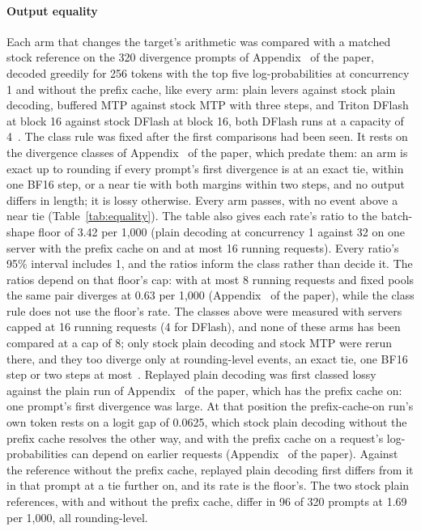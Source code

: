 \paragraph{Output equality}\label{sec:serving-equality} Each arm that changes the target's arithmetic was compared with a matched stock reference on the 320 divergence prompts of Appendix~ of the paper, decoded greedily for 256 tokens with the top five log-probabilities at concurrency 1 and without the prefix cache, like every arm: plain levers against stock plain decoding, buffered MTP against stock MTP with three steps, and Triton DFlash at block 16 against stock DFlash at block 16, both DFlash runs at a capacity of 4~. The class rule was fixed after the first comparisons had been seen. It rests on the divergence classes of Appendix~ of the paper, which predate them: an arm is exact up to rounding if every prompt's first divergence is at an exact tie, within one BF16 step, or a near tie with both margins within two steps, and no output differs in length; it is lossy otherwise. Every arm passes, with no event above a near tie (Table~\ref{tab:equality}). The table also gives each rate's ratio to the batch-shape floor of 3.42 per 1,000 (plain decoding at concurrency 1 against 32 on one server with the prefix cache on and at most 16 running requests). Every ratio's 95\% interval includes 1, and the ratios inform the class rather than decide it. The ratios depend on that floor's cap: with at most 8 running requests and fixed pools the same pair diverges at 0.63 per 1,000 (Appendix~ of the paper), while the class rule does not use the floor's rate. The classes above were measured with servers capped at 16 running requests (4 for DFlash), and none of these arms has been compared at a cap of 8; only stock plain decoding and stock MTP were rerun there, and they too diverge only at rounding-level events, an exact tie, one BF16 step or two steps at most~. Replayed plain decoding was first classed lossy against the plain run of Appendix~ of the paper, which has the prefix cache on: one prompt's first divergence was large. At that position the prefix-cache-on run's own token rests on a logit gap of 0.0625, which stock plain decoding without the prefix cache resolves the other way, and with the prefix cache on a request's log-probabilities can depend on earlier requests (Appendix~ of the paper). Against the reference without the prefix cache, replayed plain decoding first differs from it in that prompt at a tie further on, and its rate is the floor's. The two stock plain references, with and without the prefix cache, differ in 96 of 320 prompts at 1.69 per 1,000, all rounding-level.

